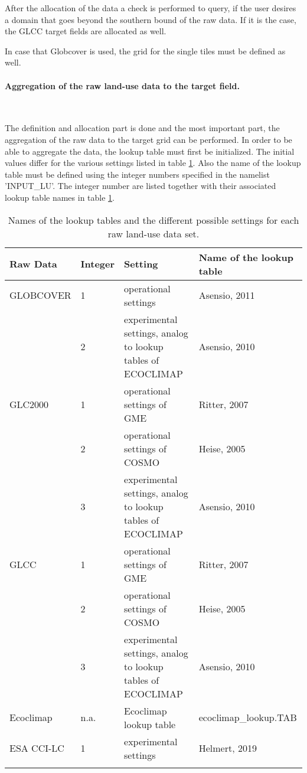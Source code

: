 \documentclass[a4paper,10pt,DIV14,BCOR1cm,titlepage,twoside]{scrartcl}
\providecommand{\tabularnewline}{\\}
\begin{document}
\noindent After the allocation of the data a check is performed to query, if the user desires a domain that goes beyond the southern bound of the raw data. If it is the case, the GLCC target fields are allocated as well.  \par\medskip\noindent
In case that Globcover is used, the grid for the single tiles must be defined as well.\par\medskip\noindent
\paragraph{Aggregation of the raw land-use data to the target field.}\ \par\medskip\noindent
The definition and allocation part is done and the most important part, the aggregation of the raw data to the target grid can be performed. In order to be able to aggregate the data, the lookup table must first be initialized. The initial values differ for the various settings listed in table \ref{tab:look_up_table}. Also the name of the lookup table must be defined using the integer numbers specified in the namelist 'INPUT\_LU'. The integer number are listed together with their associated lookup table names in table \ref{tab:look_up_table}.
\begin{longtable}{p{2.25cm}p{1.25cm}p{6.5cm}p{4.5cm}}
\textbf{Raw Data} & \textbf{Integer} & \textbf{Setting} & \textbf{Name of the lookup table}\tabularnewline
\hline
\endhead
\hline
GLOBCOVER & 1 & operational settings & Asensio, 2011 \tabularnewline\hline
          & 2 & experimental settings, analog to lookup tables of ECOCLIMAP& Asensio, 2010 \tabularnewline\hline
GLC2000 & 1 & operational settings of GME & Ritter, 2007 \tabularnewline\hline
        & 2 & operational settings of COSMO & Heise, 2005 \tabularnewline\hline
        & 3 & experimental settings, analog to lookup tables of ECOCLIMAP & Asensio, 2010 \tabularnewline\hline
GLCC & 1 & operational settings of GME & Ritter, 2007 \tabularnewline\hline
     & 2 & operational settings of COSMO & Heise, 2005 \tabularnewline\hline
     & 3 & experimental settings, analog to lookup tables of ECOCLIMAP & Asensio, 2010 \tabularnewline\hline
Ecoclimap & n.a. & Ecoclimap lookup table & ecoclimap\_lookup.TAB \tabularnewline
ESA CCI-LC & 1 & experimental settings & Helmert, 2019 \tabularnewline
\bottomrule
\caption{Names of the lookup tables and the different possible settings for each raw land-use data set.}
\label{tab:look_up_table}
\end{longtable}
\par\medskip\noindent
\end{document}
